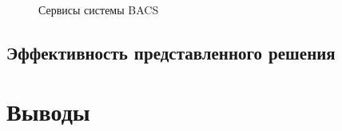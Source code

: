 \begin{figure}[H]
    \centering
    
    \caption{Сервисы системы BACS}
    \label{fig:bacsservice}
\end{figure}

\subsection{Эффективность представленного решения}

\section{Выводы}

